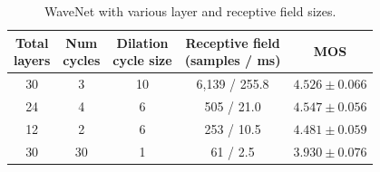 \begin{table}[H]
  \centering
  \begin{tabular}{ccccc}
  \toprule
  \makecell{Total\\layers} & \makecell{Num\\cycles} &
  \makecell{Dilation\\cycle size} & \makecell{Receptive field\\(samples / ms)} &
  MOS \\
  \midrule
  30 & 3  & 10 & 6,139 / 255.8 & $4.526 \pm 0.066$   \\
  24 & 4 &  6 & 505 / 21.0 & $4.547 \pm 0.056$   \\
  12 & 2 &  6 & 253 / 10.5 & $4.481 \pm 0.059$   \\
  30 & 30 &  1 & 61 / 2.5 & $3.930 \pm 0.076$ \\
  \bottomrule
  \end{tabular}
\caption{WaveNet with various layer and receptive field sizes.}
\label{tbl:wavenets}
\end{table}
